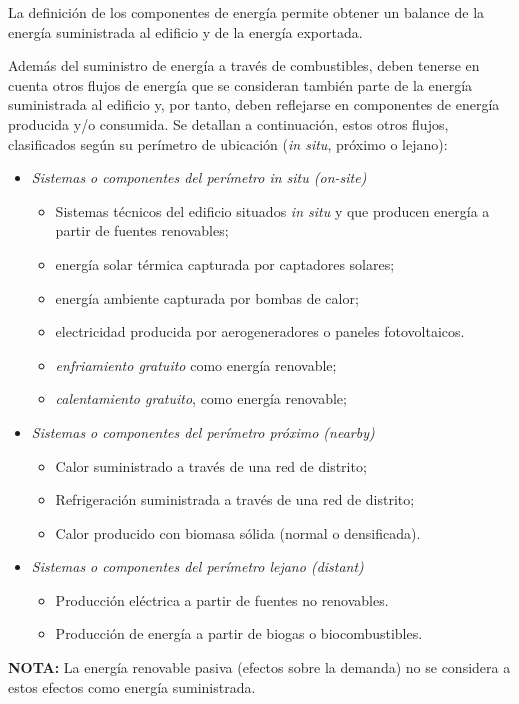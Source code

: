 \documentclass[10pt,notitlepage,oneside,a4paper]{article}
\begin{document}
\begin{myquote}\small
La definición de los componentes de energía permite obtener un balance de la energía suministrada al edificio y de la energía exportada.

Además del suministro de energía a través de combustibles, deben tenerse en cuenta otros flujos de energía que se consideran también parte de la energía suministrada al edificio y, por tanto, deben reflejarse en componentes de energía producida y/o consumida. Se detallan a continuación, estos otros flujos, clasificados según su perímetro de ubicación (\textit{in situ}, próximo o lejano):

\begin{itemize}
\item \textit{Sistemas o componentes del perímetro \textit{in situ} (on-site)}

\begin{itemize}
\item Sistemas técnicos del edificio situados \textit{in situ} y que producen energía a partir de fuentes renovables;
\item energía solar térmica capturada por captadores solares;
\item energía ambiente capturada por bombas de calor;
\item electricidad producida por aerogeneradores o paneles fotovoltaicos.
\item \textit{enfriamiento gratuito} como energía renovable;
\item \textit{calentamiento gratuito}, como energía renovable;
\end{itemize}

\item \textit{Sistemas o componentes del perímetro \textit{próximo} (nearby)}

\begin{itemize}
\item Calor suministrado a través de una red de distrito;
\item Refrigeración suministrada a través de una red de distrito;
\item Calor producido con biomasa sólida (normal o densificada).
\end{itemize}

\item \textit{Sistemas o componentes del perímetro \textit{lejano} (distant)}

\begin{itemize}
\item Producción eléctrica a partir de fuentes no renovables.
\item Producción de energía a partir de biogas o biocombustibles.
\end{itemize}
\end{itemize}

\textbf{NOTA:} La energía renovable pasiva (efectos sobre la demanda) no se considera a estos efectos como energía suministrada.
\end{myquote}
\end{document}
